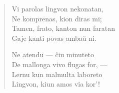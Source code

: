 \begin{verse}
                     Vi parolas lingvon nekonatan,\\
                     Ne komprenas, kion diras mi;\\
                     Tamen, frato, kanton nun faratan\\
                     Gaje kanti povas amba\u u ni.

                     Ne atendu --- \^ciu minuteto\\
                     De mallonga vivo flugas for, ---\\
                     Lernu kun malmulta laboreto\\
                     Lingvon, kiun amos via kor'!

\end{verse}

\smallrule{}
